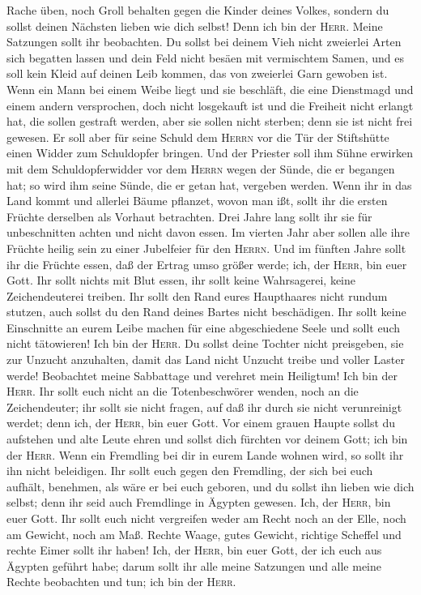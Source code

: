 Rache üben, noch Groll behalten gegen die Kinder deines Volkes, sondern
du sollst deinen Nächsten lieben wie dich selbst! Denn ich bin der
\textsc{Herr}.  Meine Satzungen sollt ihr beobachten. Du
sollst bei deinem Vieh nicht zweierlei Arten sich begatten lassen und
dein Feld nicht besäen mit vermischtem Samen, und es soll kein Kleid auf
deinen Leib kommen, das von zweierlei Garn gewoben ist. 
Wenn ein Mann bei einem Weibe liegt und sie beschläft, die eine
Dienstmagd und einem andern versprochen, doch nicht losgekauft ist und
die Freiheit nicht erlangt hat, die sollen gestraft werden, aber sie
sollen nicht sterben; denn sie ist nicht frei gewesen. 
Er soll aber für seine Schuld dem \textsc{Herrn} vor die Tür der
Stiftshütte einen Widder zum Schuldopfer bringen.  Und
der Priester soll ihm Sühne erwirken mit dem Schuldopferwidder vor dem
\textsc{Herrn} wegen der Sünde, die er begangen hat; so wird ihm seine
Sünde, die er getan hat, vergeben werden.  Wenn ihr in
das Land kommt und allerlei Bäume pflanzet, wovon man ißt, sollt ihr die
ersten Früchte derselben als Vorhaut betrachten. Drei Jahre lang sollt
ihr sie für unbeschnitten achten und nicht davon essen. 
Im vierten Jahr aber sollen alle ihre Früchte heilig sein zu einer
Jubelfeier für den \textsc{Herrn}.  Und im fünften Jahre
sollt ihr die Früchte essen, daß der Ertrag umso größer werde; ich, der
\textsc{Herr}, bin euer Gott.  Ihr sollt nichts mit Blut
essen, ihr sollt keine Wahrsagerei, keine Zeichendeuterei treiben.
 Ihr sollt den Rand eures Haupthaares nicht rundum
stutzen, auch sollst du den Rand deines Bartes nicht beschädigen.
 Ihr sollt keine Einschnitte an eurem Leibe machen für
eine abgeschiedene Seele und sollt euch nicht tätowieren! Ich bin der
\textsc{Herr}.  Du sollst deine Tochter nicht preisgeben,
sie zur Unzucht anzuhalten, damit das Land nicht Unzucht treibe und
voller Laster werde!  Beobachtet meine Sabbattage und
verehret mein Heiligtum! Ich bin der \textsc{Herr}.  Ihr
sollt euch nicht an die Totenbeschwörer wenden, noch an die
Zeichendeuter; ihr sollt sie nicht fragen, auf daß ihr durch sie nicht
verunreinigt werdet; denn ich, der \textsc{Herr}, bin euer Gott.
 Vor einem grauen Haupte sollst du aufstehen und alte
Leute ehren und sollst dich fürchten vor deinem Gott; ich bin der
\textsc{Herr}.  Wenn ein Fremdling bei dir in eurem Lande
wohnen wird, so sollt ihr ihn nicht beleidigen.  Ihr
sollt euch gegen den Fremdling, der sich bei euch aufhält, benehmen, als
wäre er bei euch geboren, und du sollst ihn lieben wie dich selbst; denn
ihr seid auch Fremdlinge in Ägypten gewesen. Ich, der \textsc{Herr}, bin
euer Gott.  Ihr sollt euch nicht vergreifen weder am
Recht noch an der Elle, noch am Gewicht, noch am Maß. 
Rechte Waage, gutes Gewicht, richtige Scheffel und rechte Eimer sollt
ihr haben! Ich, der \textsc{Herr}, bin euer Gott, der ich euch aus
Ägypten geführt habe;  darum sollt ihr alle meine
Satzungen und alle meine Rechte beobachten und tun; ich bin der
\textsc{Herr}.

